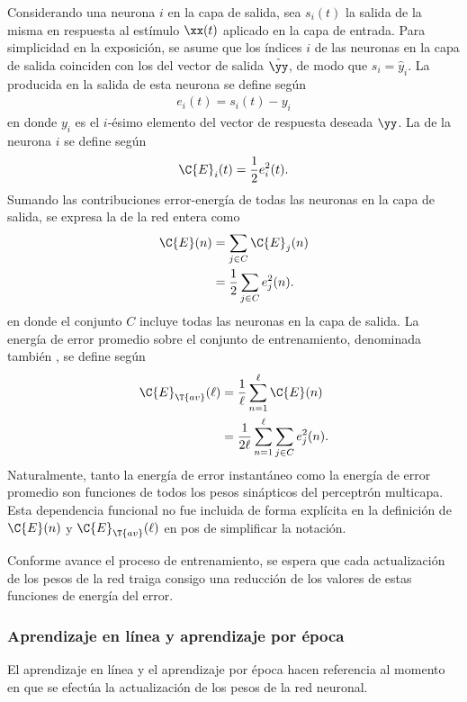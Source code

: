 Considerando una neurona $i$ en la capa de salida, sea $s_i(t)$ la
salida de la misma en respuesta al estímulo $\xx(t)$ aplicado en la
capa de entrada.  Para simplicidad en la exposición, se asume que los
índices $i$ de las neuronas en la capa de salida coinciden con los del
vector de salida $\hat{\yy}$, de modo que $s_i=\hat{y}_i$.  La
 producida en la salida de esta neurona se define
según
%
\begin{align}\label{4.2}
  e_i(t)=s_{i}(t)-y_{i}
\end{align}
%
en donde $y_{i}$ es el $i$-ésimo elemento del vector de respuesta
deseada $\yy$. La  de la neurona
$i$ se define según
%
\begin{align}
\label{4.3}
  \C{E}_i(t)=\frac{1}{2}e^2_i(t).
\end{align}
%
Sumando las contribuciones error-energía de todas las neuronas en la
capa de salida, se expresa la 
de la red entera como
%
\begin{align}
\label{4.4}
  \C{E}(n)&=\sum_{j\in C}\C{E}_j(n) \\
  &=\frac{1}{2}\sum_{j\in C}e^2_j(n).
\end{align}
%
en donde el conjunto $C$ incluye todas las neuronas en la capa de
salida. La energía de error promedio sobre el conjunto de entrenamiento,
denominada también , se define según
%
\begin{align}
\label{4.5}
  \C{E}_{\T{av}}(\ell)&=\frac{1}{\ell}\sum_{n=1}^\ell\C{E}(n) \\
  &=\frac{1}{2\ell} \sum_{n=1}^\ell \sum_{j\in C}e^2_j(n).
\end{align}
%
Naturalmente, tanto la energía de error instantáneo como la energía de
error promedio son funciones de todos los pesos sinápticos del
perceptrón multicapa. Esta dependencia funcional no fue incluida de
forma explícita en la definición de $\C{E}(n)$ y
$\C{E}_{\T{av}}(\ell)$ en pos de simplificar la notación.

Conforme avance el proceso de entrenamiento, se espera que cada
actualización de los pesos de la red traiga consigo una reducción de
los valores de estas funciones de energía del error.

%
\subsubsection{Aprendizaje en línea y aprendizaje por época}
%
El aprendizaje en línea y el aprendizaje por época hacen referencia
al momento en que se efectúa la actualización de los pesos de la
red neuronal.

